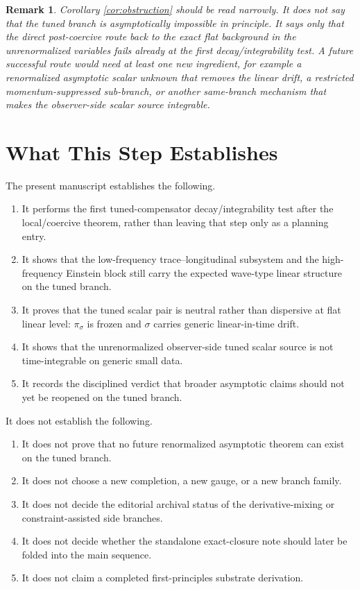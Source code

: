\documentclass[11pt]{article}
\newtheorem{remark}{Remark}
\begin{document}
\begin{remark}
Corollary \ref{cor:obstruction} should be read narrowly. It does not say that the tuned branch is asymptotically impossible in principle. It says only that the \emph{direct} post-coercive route back to the exact flat background in the unrenormalized variables fails already at the first decay/integrability test. A future successful route would need at least one new ingredient, for example a renormalized asymptotic scalar unknown that removes the linear drift, a restricted momentum-suppressed sub-branch, or another same-branch mechanism that makes the observer-side scalar source integrable.
\end{remark}

\section{What This Step Establishes}

The present manuscript establishes the following.
\begin{enumerate}
    \item It performs the first tuned-compensator decay/integrability test after the local/coercive theorem, rather than leaving that step only as a planning entry.
    \item It shows that the low-frequency trace--longitudinal subsystem and the high-frequency Einstein block still carry the expected wave-type linear structure on the tuned branch.
    \item It proves that the tuned scalar pair is neutral rather than dispersive at flat linear level: \(\pi_\sigma\) is frozen and \(\sigma\) carries generic linear-in-time drift.
    \item It shows that the unrenormalized observer-side tuned scalar source is not time-integrable on generic small data.
    \item It records the disciplined verdict that broader asymptotic claims should not yet be reopened on the tuned branch.
\end{enumerate}

It does not establish the following.
\begin{enumerate}
    \item It does not prove that no future renormalized asymptotic theorem can exist on the tuned branch.
    \item It does not choose a new completion, a new gauge, or a new branch family.
    \item It does not decide the editorial archival status of the derivative-mixing or constraint-assisted side branches.
    \item It does not decide whether the standalone exact-closure note should later be folded into the main sequence.
    \item It does not claim a completed first-principles substrate derivation.
\end{enumerate}
\end{document}
